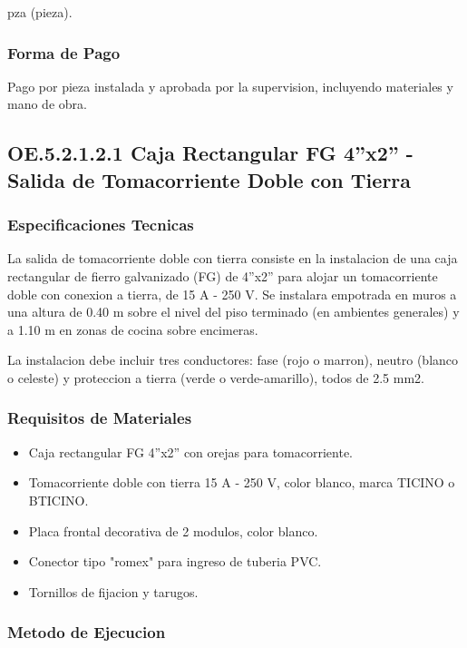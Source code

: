 pza (pieza).

\subsubsection{Forma de Pago}

Pago por pieza instalada y aprobada por la supervision, incluyendo materiales y mano de obra.

\subsection{OE.5.2.1.2.1 Caja Rectangular FG 4''x2'' - Salida de Tomacorriente Doble con Tierra}

\subsubsection{Especificaciones Tecnicas}

La salida de tomacorriente doble con tierra consiste en la instalacion de una caja rectangular de fierro galvanizado (FG) de 4''x2'' para alojar un tomacorriente doble con conexion a tierra, de 15 A - 250 V. Se instalara empotrada en muros a una altura de 0.40 m sobre el nivel del piso terminado (en ambientes generales) y a 1.10 m en zonas de cocina sobre encimeras.

La instalacion debe incluir tres conductores: fase (rojo o marron), neutro (blanco o celeste) y proteccion a tierra (verde o verde-amarillo), todos de 2.5 mm2.

\subsubsection{Requisitos de Materiales}

\begin{itemize}
  \item Caja rectangular FG 4''x2'' con orejas para tomacorriente.
  \item Tomacorriente doble con tierra 15 A - 250 V, color blanco, marca TICINO o BTICINO.
  \item Placa frontal decorativa de 2 modulos, color blanco.
  \item Conector tipo "romex" para ingreso de tuberia PVC.
  \item Tornillos de fijacion y tarugos.
\end{itemize}

\subsubsection{Metodo de Ejecucion}

